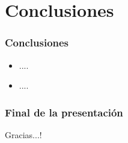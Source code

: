 \documentclass[aspectratio=169]{beamer}
\begin{document}
\section{Conclusiones}
\begin{frame}
\frametitle{Conclusiones}
\begin{itemize}
\item ....\vspace{.25cm}
\item ....
\end{itemize}
\end{frame}
\begin{frame}
\frametitle{Final de la presentación}

\Huge Gracias...!
\end{frame}
\end{document}
